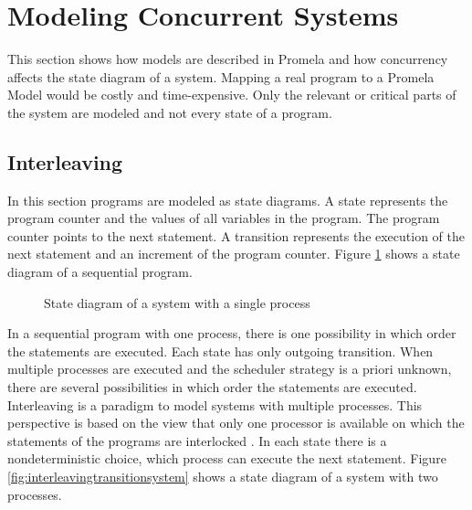 \documentclass[a4paper, twoside]{article}
\begin{document}
\section{Modeling Concurrent Systems}
\label{sec:concurrency}

This section shows how models are described in Promela and how concurrency affects the state diagram of a system. Mapping a real program to a Promela Model would be costly and time-expensive. Only the relevant or critical parts of the system are modeled and not every state of a program.


\subsection{Interleaving}
\label{sec:interleaving}

In this section programs are modeled as state diagrams. A state represents the program counter and the values of all variables in the program. The program counter points to the next statement. A transition represents the execution of the next statement and an increment of the program counter. Figure \ref{fig:sequencielstatediagram} shows a state diagram of a sequential program.

\begin{figure}
 \centering

  \caption{State diagram of a system with a single process}
  \label{fig:sequencielstatediagram}
\end{figure}

In a sequential program with one process, there is one possibility in which order the statements are executed. Each state has only outgoing transition. When multiple processes are executed and the scheduler strategy is a priori unknown, there are several possibilities in which order the statements are executed. Interleaving is a paradigm to model systems with multiple processes. This perspective is based on the view that only one processor is available on which the statements of the programs are interlocked \cite{baier08}. In each state there is a nondeterministic choice, which process can execute the next statement. Figure \ref{fig:interleavingtransitionsystem} shows a state diagram of a system with two processes.
\end{document}
